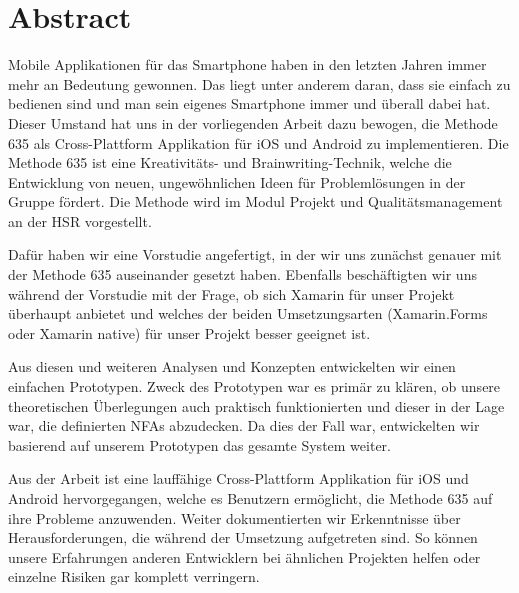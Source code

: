 \thispagestyle{empty}
\section*{Abstract}
Mobile Applikationen für das Smartphone haben in den letzten Jahren immer mehr an Bedeutung gewonnen. Das liegt unter anderem daran, dass sie einfach zu bedienen sind und man sein eigenes Smartphone immer und überall dabei hat. Dieser Umstand hat uns in der vorliegenden Arbeit dazu bewogen, die Methode 635 als Cross-Plattform Applikation für iOS und Android zu implementieren. Die Methode 635 ist eine Kreativitäts- und Brainwriting-Technik, welche die Entwicklung von neuen, ungewöhnlichen Ideen für Problemlösungen in der Gruppe fördert. Die Methode wird im Modul \grqq Projekt und Qualitätsmanagement\grqq{} an der HSR vorgestellt.

Dafür haben wir eine Vorstudie angefertigt, in der wir uns zunächst genauer mit der Methode 635 auseinander gesetzt haben. Ebenfalls beschäftigten wir uns während der Vorstudie mit der Frage, ob sich Xamarin für unser Projekt überhaupt anbietet und welches der beiden Umsetzungsarten (Xamarin.Forms oder Xamarin native) für unser Projekt besser geeignet ist.

Aus diesen und weiteren Analysen und Konzepten entwickelten wir einen einfachen Prototypen. Zweck des Prototypen war es primär zu klären, ob unsere theoretischen Überlegungen auch praktisch funktionierten und dieser in der Lage war, die definierten NFAs abzudecken. Da dies der Fall war, entwickelten wir basierend auf unserem Prototypen das gesamte System weiter.

Aus der Arbeit ist eine lauffähige Cross-Plattform Applikation für iOS und Android hervorgegangen, welche es Benutzern ermöglicht, die Methode 635 auf ihre Probleme anzuwenden. Weiter dokumentierten wir Erkenntnisse über Herausforderungen, die während der Umsetzung aufgetreten sind. So können unsere Erfahrungen anderen Entwicklern bei ähnlichen Projekten helfen oder einzelne Risiken gar komplett verringern. 